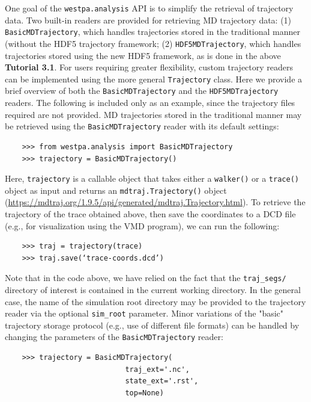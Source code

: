 One goal of the \verb|westpa.analysis| API is to simplify the retrieval of trajectory data.
Two built-in readers are provided for retrieving MD trajectory data: (1) \verb|BasicMDTrajectory|, which handles trajectories stored in the traditional manner (without the HDF5 trajectory framework; (2) \verb|HDF5MDTrajectory|, which handles trajectories stored using the new HDF5 framework, as is done in the above \textbf{Tutorial 3.1}.
For users requiring greater flexibility, custom trajectory readers can be implemented using the more general \verb|Trajectory| class.
Here we provide a brief overview of both the \verb|BasicMDTrajectory| and the \verb|HDF5MDTrajectory| readers.
The following is included only as an example, since the trajectory files required are not provided.
MD trajectories stored in the traditional manner may be retrieved using the \verb|BasicMDTrajectory| reader with its default settings:

\begin{verbatim}
    >>> from westpa.analysis import BasicMDTrajectory
    >>> trajectory = BasicMDTrajectory()
\end{verbatim}

Here, \verb|trajectory| is a callable object that takes either a \verb|walker()| or a \verb|trace()| object as input and returns an \verb|mdtraj.Trajectory()| object ({\url{https://mdtraj.org/1.9.5/api/generated/mdtraj.Trajectory.html}}).
To retrieve the trajectory of the trace obtained above, then save the coordinates to a DCD file (e.g., for visualization using the VMD program), we can run the following:

\begin{verbatim}
    >>> traj = trajectory(trace)
    >>> traj.save(‘trace-coords.dcd’)
\end{verbatim}

Note that in the code above, we have relied on the fact that the \verb|traj_segs/| directory of interest is contained in the current working directory.
In the general case, the name of the simulation root directory may be provided to the trajectory reader via the optional \verb|sim_root| parameter.
Minor variations of the "basic" trajectory storage protocol (e.g., use of different file formats) can be handled by changing the parameters of the \verb|BasicMDTrajectory| reader: 

\begin{verbatim}
    >>> trajectory = BasicMDTrajectory(
                            traj_ext='.nc', 
                            state_ext='.rst', 
                            top=None)
\end{verbatim}

